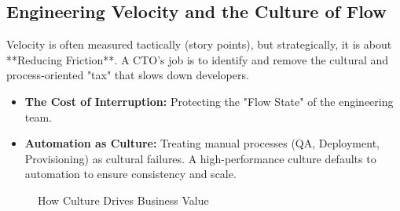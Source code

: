 \subsection{Engineering Velocity and the Culture of Flow}

Velocity is often measured tactically (story points), but strategically, it is about **Reducing Friction**. A CTO's job is to identify and remove the cultural and process-oriented "tax" that slows down developers.

\begin{itemize}
    \item \textbf{The Cost of Interruption:} Protecting the "Flow State" of the engineering team.
    \item \textbf{Automation as Culture:} Treating manual processes (QA, Deployment, Provisioning) as cultural failures. A high-performance culture defaults to automation to ensure consistency and scale.
\end{itemize}

\begin{figure}[h]
    \centering
    \caption{How Culture Drives Business Value}
    \label{fig:cultural_value_chain}
\end{figure}
